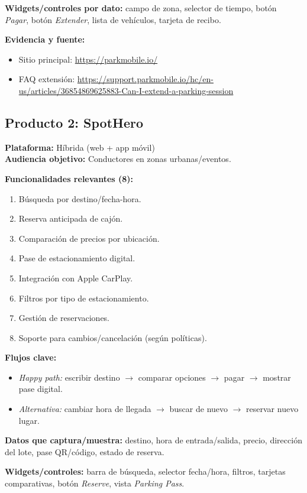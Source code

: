 \documentclass[11pt]{article}
\begin{document}
\textbf{Widgets/controles por dato:} campo de zona, selector de tiempo, botón \textit{Pagar}, botón \textit{Extender}, lista de vehículos, tarjeta de recibo.

\textbf{Evidencia y fuente:}
\begin{itemize}
\item Sitio principal: \url{https://parkmobile.io/}
\item FAQ extensión: \url{https://support.parkmobile.io/hc/en-us/articles/36854869625883-Can-I-extend-a-parking-session}
\end{itemize}

\subsection{Producto 2: SpotHero}
\textbf{Plataforma:} Híbrida (web + app móvil)\\
\textbf{Audiencia objetivo:} Conductores en zonas urbanas/eventos.

\textbf{Funcionalidades relevantes (8):}
\begin{enumerate}
\item Búsqueda por destino/fecha-hora.
\item Reserva anticipada de cajón.
\item Comparación de precios por ubicación.
\item Pase de estacionamiento digital.
\item Integración con Apple CarPlay.
\item Filtros por tipo de estacionamiento.
\item Gestión de reservaciones.
\item Soporte para cambios/cancelación (según políticas).
\end{enumerate}

\textbf{Flujos clave:}
\begin{itemize}
\item \textit{Happy path:} escribir destino $\rightarrow$ comparar opciones $\rightarrow$ pagar $\rightarrow$ mostrar pase digital.
\item \textit{Alternativa:} cambiar hora de llegada $\rightarrow$ buscar de nuevo $\rightarrow$ reservar nuevo lugar.
\end{itemize}

\textbf{Datos que captura/muestra:} destino, hora de entrada/salida, precio, dirección del lote, pase QR/código, estado de reserva.

\textbf{Widgets/controles:} barra de búsqueda, selector fecha/hora, filtros, tarjetas comparativas, botón \textit{Reserve}, vista \textit{Parking Pass}.
\end{document}
